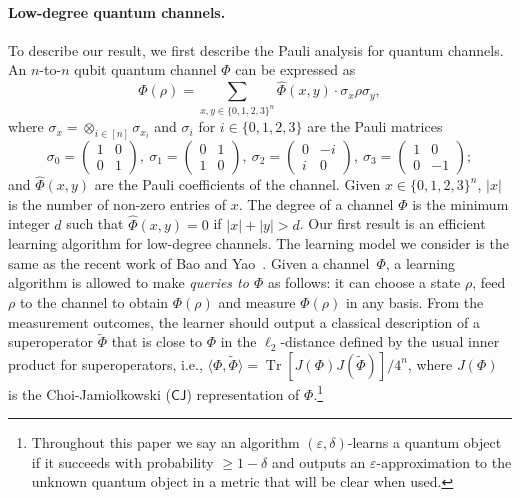 \documentclass[11pt]{article}
\newcommand{\CJ}{\textsf{CJ}}
\theoremstyle{plain}
\DeclareMathOperator{\Tr}{Tr}
\theoremstyle{plain}
\theoremstyle{definition}
\theoremstyle{remark}
\theoremstyle{named}
\begin{document}
\paragraph{Low-degree quantum channels.} To describe our result, we first describe the Pauli analysis for quantum channels.  An $n$-to-$n$ qubit quantum channel $\Phi$ can be expressed as
\begin{equation}
    \Phi(\rho) = \sum_{x,y \in \{0,1,2,3\}^n} \widehat\Phi (x,y) \cdot \sigma_x \rho \sigma_y,
    \label{def:arb_channel}
\end{equation}
where $\sigma_x=\mathop{\otimes}_{i\in [n]}\sigma_{x_i}$ and  $\sigma_i$ for $i\in \{0,1,2,3\}$ are the Pauli matrices  
\begin{equation*}
    \sigma_0=\begin{pmatrix}
        1 & 0\\ 0 & 1
    \end{pmatrix},\ \sigma_1=\begin{pmatrix}
        0 & 1\\ 1 & 0
    \end{pmatrix},\ \sigma_2=\begin{pmatrix}
        0 & -i\\ i & 0
    \end{pmatrix},\ \sigma_3=\begin{pmatrix}
        1 & 0\\ 0 & -1
    \end{pmatrix};
\end{equation*} 
and $\widehat\Phi (x,y)$ are the Pauli coefficients of the channel. 
Given $x\in \{0,1,2,3\}^n$, $|x|$ is the number of  non-zero entries of $x$.  The degree of a channel $\Phi$ is the minimum integer $d$ such that $\widehat{\Phi}(x,y)=0$ if $|x|+|y|>d$. Our first result is an efficient learning algorithm for low-degree channels. The learning model we consider is the same as the recent work of Bao and Yao~\cite{bao2023nearly}. Given a channel~$\Phi$, a learning algorithm is allowed to make \emph{queries to $\Phi$} as follows: it can choose a state $\rho$, feed $\rho$ to the channel to obtain $\Phi(\rho)$ and measure $\Phi(\rho)$ in any basis. From the measurement outcomes, the learner should output a classical description of a superoperator $\widetilde \Phi$ that is close to $\Phi$ in the $\ell_2$-distance defined by the usual inner product for superoperators, i.e.,  $\langle \Phi, \widetilde{\Phi}\rangle=\Tr[J(\Phi) J(\widetilde{\Phi})]/4^n$, where $J(\Phi)$ is the Choi-Jamiolkowski
($\CJ$) representation of $\Phi$.\footnote{ Throughout this paper we say an algorithm $(\varepsilon,\delta)$-learns a quantum object if it succeeds with probability $\geq 1-\delta$ and outputs an $\varepsilon$-approximation to the unknown quantum object in a metric that will be clear when used.} 
\end{document}
